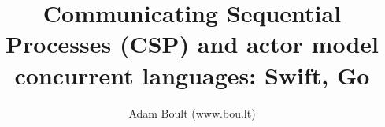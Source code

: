 \documentclass[oneside]{book}
\begin{document}
\author{Adam Boult (www.bou.lt)}
\title{Communicating Sequential Processes (CSP) and actor model concurrent languages: Swift, Go}
\maketitle

\setcounter{tocdepth}{0}
\tableofcontents


\end{document}

